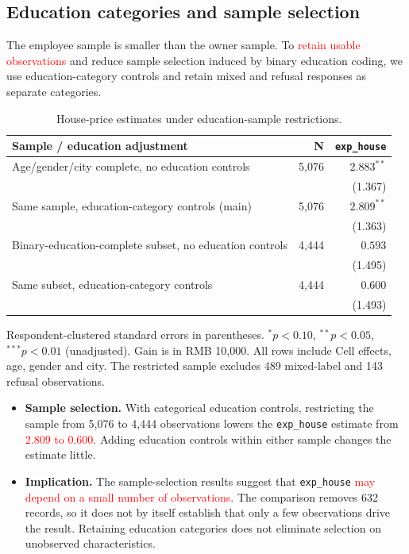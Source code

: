 \documentclass[11pt,letterpaper,english,final]{article}
\begin{document}
\subsection{Education categories and sample selection}
The employee sample is smaller than the owner sample. To \textcolor{red}{retain usable observations} and reduce sample selection induced by binary education coding, we use education-category controls and retain mixed and refusal responses as separate categories. 


\begin{table}[H]
\centering\small
\setlength{\tabcolsep}{5pt}
\caption{House-price estimates under education-sample restrictions.}
\begin{tabular}{lrr}
\toprule
Sample / education adjustment & N & \texttt{exp\_house} \\
\midrule
Age/gender/city complete, no education controls & 5,076 & $\bm{2.883}^{**}$ \\
 & & (1.367) \\[3pt]
Same sample, education-category controls (main) & 5,076 & $\bm{2.809}^{**}$ \\
 & & (1.363) \\[3pt]
Binary-education-complete subset, no education controls & 4,444 & $0.593$ \\
 & & (1.495) \\[3pt]
Same subset, education-category controls & 4,444 & $0.600$ \\
 & & (1.493) \\[3pt]
\bottomrule
\end{tabular}
\par\vspace{4pt}\begin{minipage}{\linewidth}\footnotesize Respondent-clustered standard errors in parentheses. $^{*}p<0.10$, $^{**}p<0.05$, $^{***}p<0.01$ (unadjusted). Gain is in RMB 10,000. All rows include Cell effects, age, gender and city. The restricted sample excludes 489 mixed-label and 143 refusal observations.\end{minipage}
\end{table}

\begin{itemize}
\item \textbf{Sample selection.} With categorical education controls, restricting the sample from 5,076 to 4,444 observations lowers the \texttt{exp\_house} estimate from \textcolor{red}{2.809 to 0.600}. Adding education controls within either sample changes the estimate little.
\item \textbf{Implication.} The sample-selection results suggest that \texttt{exp\_house} \textcolor{red}{may depend on a small number of observations}. The comparison removes 632 records, so it does not by itself establish that only a few observations drive the result. Retaining education categories does not eliminate selection on unobserved characteristics.
\end{itemize}
\end{document}
